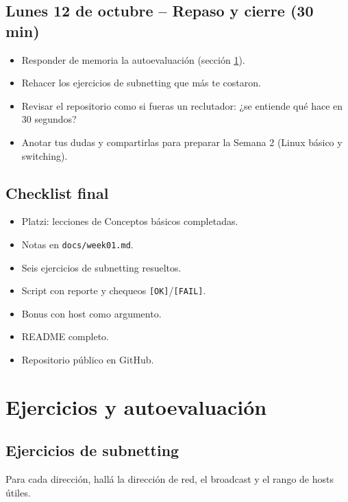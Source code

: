 \documentclass[11pt,a4paper]{article}
\theoremstyle{definition}
\theoremstyle{remark}
\begin{document}
\subsection{Lunes 12 de octubre -- Repaso y cierre (30 min)}

\begin{itemize}[label=$\square$]
  \item Responder de memoria la autoevaluación (sección \ref{sec:auto}).
  \item Rehacer los ejercicios de subnetting que más te costaron.
  \item Revisar el repositorio como si fueras un reclutador: ¿se entiende qué hace en 30 segundos?
  \item Anotar tus dudas y compartirlas para preparar la Semana 2 (Linux básico y switching).
\end{itemize}

\subsection{Checklist final}

\begin{itemize}[label=$\square$]
  \item Platzi: lecciones de Conceptos básicos completadas.
  \item Notas en \texttt{docs/week01.md}.
  \item Seis ejercicios de subnetting resueltos.
  \item Script con reporte y chequeos \texttt{[OK]}/\texttt{[FAIL]}.
  \item Bonus con host como argumento.
  \item README completo.
  \item Repositorio público en GitHub.
\end{itemize}

\section{Ejercicios y autoevaluación}\label{sec:auto}

\subsection{Ejercicios de subnetting}\label{sec:ejsub}

Para cada dirección, hallá la dirección de red, el broadcast y el rango de hosts útiles.
\end{document}
